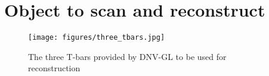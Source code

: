 






\section{Object to scan and reconstruct}

\begin{wrapfigure}{r}{0.45\textwidth} 
    \centering
    \texttt{[image: figures/three\_tbars.jpg]}
    \caption{The three T-bars provided by DNV-GL to be used for reconstruction}
    \label{fig:three_bars}
\end{wrapfigure}

